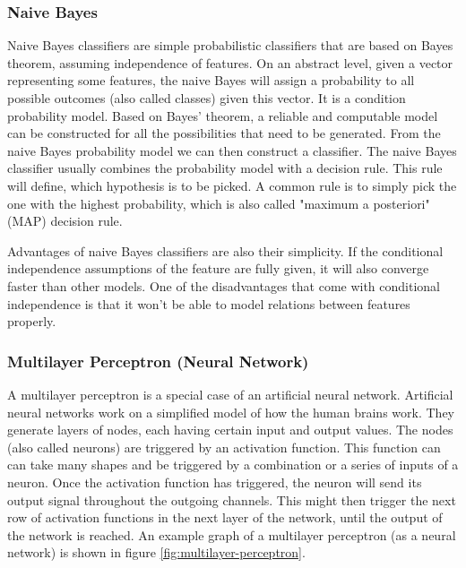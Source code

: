 \subsubsection{Naive Bayes}
Naive Bayes classifiers are simple probabilistic classifiers that are based on Bayes theorem, assuming independence of features. On an abstract level, given a vector representing some features, the naive Bayes will assign a probability to all possible outcomes (also called classes) given this vector. It is a condition probability model. Based on Bayes' theorem, a reliable and computable model can be constructed for all the possibilities that need to be generated. From the naive Bayes probability model we can then construct a classifier. The naive Bayes classifier usually combines the probability model with a decision rule. This rule will define, which hypothesis is to be picked. A common rule is to simply pick the one with the highest probability, which is also called "maximum a posteriori" (MAP) decision rule.

Advantages of naive Bayes classifiers are also their simplicity. If the conditional independence assumptions of the feature are fully given, it will also converge faster than other models. One of the disadvantages that come with conditional independence is that it won't be able to model relations between features properly. 


\subsubsection{Multilayer Perceptron (Neural Network)}
A multilayer perceptron is a special case of an artificial neural network. Artificial neural networks work on a simplified model of how the human brains work. They generate layers of nodes, each having certain input and output values. The nodes (also called neurons) are triggered by an activation function. This function can can take many shapes and be triggered by a combination or a series of inputs of a neuron. Once the activation function has triggered, the neuron will send its output signal throughout the outgoing channels. This might then trigger the next row of activation functions in the next layer of the network, until the output of the network is reached. An example graph of a multilayer perceptron (as a neural network) is shown in figure \ref{fig:multilayer-perceptron}.

